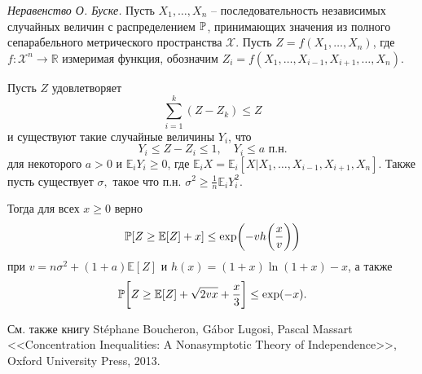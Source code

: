 \begin{remark}
{\it Неравенство О. Буске.}
Пусть $X_1,\dots,X_n$ -- последовательность независимых случайных величин с распределением $\mathrm{{\mathbb P}}$, принимающих значения из полного сепарабельного метрического пространства $\mathcal{X}$. Пусть $Z = f(X_1,\dots,X_n)$, где $f:\mathcal{X}^n\to \mathbb{R}$ измеримая функция, обозначим $Z_i = f(X_1,\dots,X_{i-1},X_{i+1},\dots,X_n)$. 

Пусть $Z$ удовлетворяет
$$
\sum_{i=1}^k(Z-Z_k)\leq Z
$$
и существуют такие случайные величины $Y_i$, что 
$$
Y_i\leq Z-Z_i\leq 1,\quad Y_i\leq a\,\, \text{п.н.}
$$
для некоторого $a>0$ и $\mathbb{E}_iY_i \geq 0$, где $\mathbb{E}_iX = \mathbb{E}_i[X|X_1,\dots,X_{i-1},X_{i+1},X_n]$.
Также пусть существует $\sigma,$ такое что п.н. $\sigma^2\geq \frac 1n \mathbb{E}_i Y_i^2$.


Тогда для всех $x\geq 0 $ верно
\begin{equation*}
\mathrm{{\mathbb P}}[Z\geq \mathbb{E}[Z]+x]\leq \exp\biggl(-vh\biggl(\frac{x}{v}\biggr)\biggr)
\end{equation*}
при    $v = n\sigma^2+ (1+a)\mathbb{E}[Z]$ и $h(x)=(1+x)\ln(1+x)-x$, а также
\begin{equation*}
\mathrm{{\mathbb P}}\biggl[Z\geq \mathbb{E}[Z]+\sqrt{2vx}+\frac{x}{3}\biggr]\leq \exp(-x).
\end{equation*}

\medskip

См. также книгу Stéphane Boucheron, Gábor Lugosi, Pascal Massart <<Concentration Inequalities: A Nonasymptotic Theory of Independence>>, Oxford University Press, 2013.

\medskip


\end{remark}
